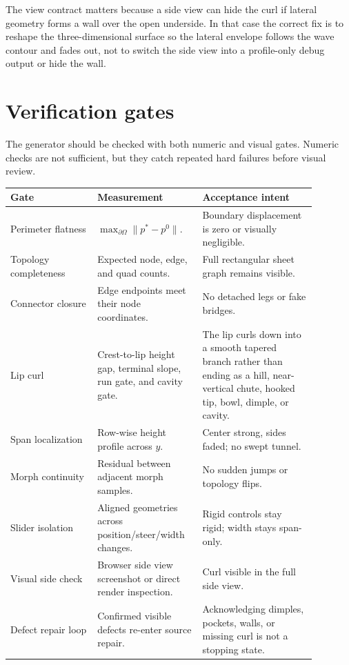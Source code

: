 \documentclass[12pt,letterpaper]{article}
\begin{document}
The view contract matters because a side view can hide the curl if lateral geometry forms a wall over the open underside. In that case the correct fix is to reshape the three-dimensional surface so the lateral envelope follows the wave contour and fades out, not to switch the side view into a profile-only debug output or hide the wall.

\section{Verification gates}

The generator should be checked with both numeric and visual gates. Numeric checks are not sufficient, but they catch repeated hard failures before visual review.

\begin{table}[H]
\centering
{\small
\begin{tabular}{Y{0.26\linewidth}Y{0.28\linewidth}Y{0.34\linewidth}}
\toprule
Gate & Measurement & Acceptance intent \\
\midrule
Perimeter flatness & \(\max_{\partial\Omega}\|p^*-p^0\|\). & Boundary displacement is zero or visually negligible. \\
Topology completeness & Expected node, edge, and quad counts. & Full rectangular sheet graph remains visible. \\
Connector closure & Edge endpoints meet their node coordinates. & No detached legs or fake bridges. \\
Lip curl & Crest-to-lip height gap, terminal slope, run gate, and cavity gate. & The lip curls down into a smooth tapered branch rather than ending as a hill, near-vertical chute, hooked tip, bowl, dimple, or cavity. \\
Span localization & Row-wise height profile across \(y\). & Center strong, sides faded; no swept tunnel. \\
Morph continuity & Residual between adjacent morph samples. & No sudden jumps or topology flips. \\
Slider isolation & Aligned geometries across position/steer/width changes. & Rigid controls stay rigid; width stays span-only. \\
Visual side check & Browser side view screenshot or direct render inspection. & Curl visible in the full side view. \\
Defect repair loop & Confirmed visible defects re-enter source repair. & Acknowledging dimples, pockets, walls, or missing curl is not a stopping state. \\

\end{tabular}}
\end{table}
\end{document}
